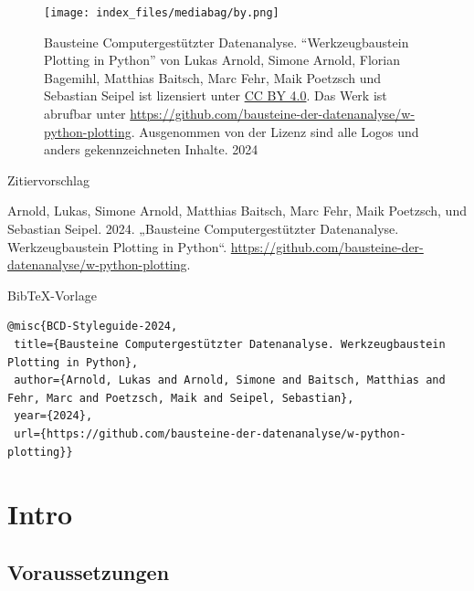 \documentclass[
  letterpaper,
  DIV=11,
  numbers=noendperiod]{scrreprt}
\begin{document}
\label{Lizenz}
\begin{figure}

\begin{minipage}{0.20\linewidth}
\texttt{[image: index\_files/mediabag/by.png]}\end{minipage}%
%
\begin{minipage}{0.80\linewidth}
Bausteine Computergestützter Datenanalyse. ``Werkzeugbaustein Plotting
in Python'' von Lukas Arnold, Simone Arnold, Florian Bagemihl, Matthias
Baitsch, Marc Fehr, Maik Poetzsch und Sebastian Seipel ist lizensiert
unter \href{https://creativecommons.org/licenses/by/4.0/deed.de}{CC BY
4.0}. Das Werk ist abrufbar unter
\url{https://github.com/bausteine-der-datenanalyse/w-python-plotting}.
Ausgenommen von der Lizenz sind alle Logos und anders gekennzeichneten
Inhalte. 2024\end{minipage}%

\end{figure}%

Zitiervorschlag

Arnold, Lukas, Simone Arnold, Matthias Baitsch, Marc Fehr, Maik
Poetzsch, und Sebastian Seipel. 2024. „Bausteine Computergestützter
Datenanalyse. Werkzeugbaustein Plotting in Python``.
\url{https://github.com/bausteine-der-datenanalyse/w-python-plotting}.

BibTeX-Vorlage

\begin{verbatim}
@misc{BCD-Styleguide-2024,
 title={Bausteine Computergestützter Datenanalyse. Werkzeugbaustein Plotting in Python},
 author={Arnold, Lukas and Arnold, Simone and Baitsch, Matthias and Fehr, Marc and Poetzsch, Maik and Seipel, Sebastian},
 year={2024},
 url={https://github.com/bausteine-der-datenanalyse/w-python-plotting}} 
\end{verbatim}

\chapter*{Intro}\label{intro}


\section*{Voraussetzungen}\label{voraussetzungen-1}

\end{document}
